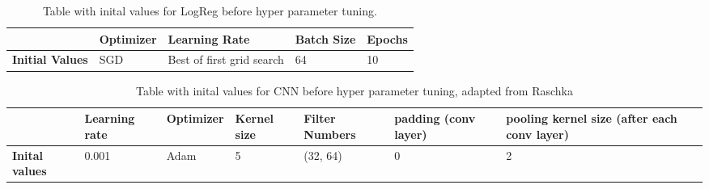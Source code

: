 \begin{table}[H]
 \centering
    \caption{Table with inital values for LogReg before hyper parameter tuning.}
\begin{tabular}{|l|l|l|l|l|}
\hline
                        & \textbf{Optimizer} & \textbf{Learning Rate}    & \textbf{Batch Size} & \textbf{Epochs} \\ \hline
\textbf{Initial Values} & SGD                & Best of first grid search & 64                  & 10              \\ \hline
\end{tabular}
\label{tb:loginitial}
\end{table}

\begin{table}[H]
    \centering
    \caption{Table with inital values for CNN before hyper parameter tuning, adapted from Raschka \cite{raschka2022machine}}
    
\begin{tabular}{|p{2.5cm}|p{2cm}|l|p{1.5cm}|p{2cm}|p{2.5cm}|p{3cm}|}
\hline
                       &\textbf{Learning rate} &  \textbf{Optimizer} & \textbf{Kernel size} & \textbf{Filter Numbers}& \textbf{padding (conv layer)} & \textbf{pooling kernel size (after each conv layer)} \\ \hline
\textbf{Inital values}                 & 0.001                  & Adam               & 5                    & (32, 64)     & 0
            & 2\\ \hline
\end{tabular}
\label{tb:initialvalues}
\end{table}

